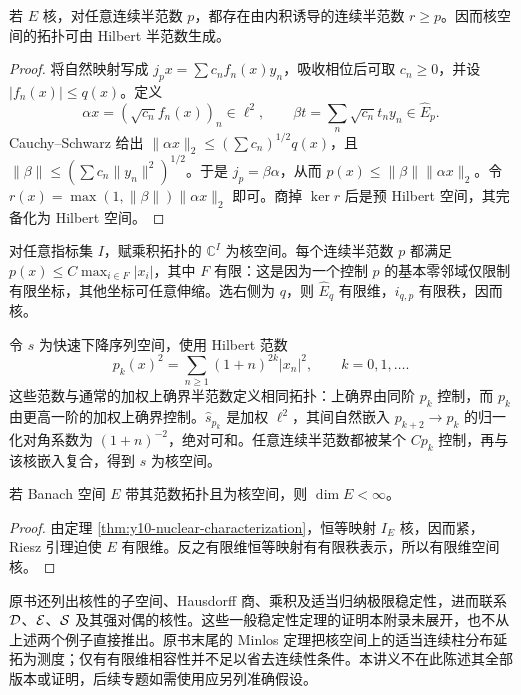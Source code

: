 \begin{proposition}\label{prop:y10-hilbert-seminorm}
若 $E$ 核，对任意连续半范数 $p$，都存在由内积诱导的连续半范数 $r\ge p$。因而核空间的拓扑可由 Hilbert 半范数生成。
\end{proposition}
\begin{proof}
将自然映射写成 $j_px=\sum c_nf_n(x)y_n$，吸收相位后可取 $c_n\ge0$，并设 $|f_n(x)|\le q(x)$。定义
\[
 \alpha x=(\sqrt{c_n}f_n(x))_n\in\ell^2,\qquad
 \beta t=\sum_n\sqrt{c_n}t_ny_n\in\widehat E_p.
\]
Cauchy--Schwarz 给出 $\|\alpha x\|_2\le(\sum c_n)^{1/2}q(x)$，且 $\|\beta\|\le(\sum c_n\|y_n\|^2)^{1/2}$。于是 $j_p=\beta\alpha$，从而 $p(x)\le\|\beta\|\|\alpha x\|_2$。令 $r(x)=\max(1,\|\beta\|)\|\alpha x\|_2$ 即可。商掉 $\ker r$ 后是预 Hilbert 空间，其完备化为 Hilbert 空间。
\end{proof}

\begin{example}[乘积空间与快速下降序列]
对任意指标集 $I$，赋乘积拓扑的 $\mathbb C^I$ 为核空间。每个连续半范数 $p$ 都满足 $p(x)\le C\max_{i\in F}|x_i|$，其中 $F$ 有限：这是因为一个控制 $p$ 的基本零邻域仅限制有限坐标，其他坐标可任意伸缩。选右侧为 $q$，则 $\widehat E_q$ 有限维，$i_{q,p}$ 有限秩，因而核。

令 $s$ 为快速下降序列空间，使用 Hilbert 范数
\[
 p_k(x)^2=\sum_{n\ge1}(1+n)^{2k}|x_n|^2,\qquad k=0,1,\ldots.
\]
这些范数与通常的加权上确界半范数定义相同拓扑：上确界由同阶 $p_k$ 控制，而 $p_k$ 由更高一阶的加权上确界控制。$\widehat s_{p_k}$ 是加权 $\ell^2$，其间自然嵌入 $p_{k+2}\to p_k$ 的归一化对角系数为 $(1+n)^{-2}$，绝对可和。任意连续半范数都被某个 $Cp_k$ 控制，再与该核嵌入复合，得到 $s$ 为核空间。
\end{example}

\begin{proposition}
若 Banach 空间 $E$ 带其范数拓扑且为核空间，则 $\dim E<\infty$。
\end{proposition}
\begin{proof}
由定理 \ref{thm:y10-nuclear-characterization}，恒等映射 $I_E$ 核，因而紧，Riesz 引理迫使 $E$ 有限维。反之有限维恒等映射有有限秩表示，所以有限维空间核。
\end{proof}

原书还列出核性的子空间、Hausdorff 商、乘积及适当归纳极限稳定性，进而联系 $\mathcal{D}$、$\mathcal{E}$、$\mathcal{S}$ 及其强对偶的核性。这些一般稳定性定理的证明本附录未展开，也不从上述两个例子直接推出。原书末尾的 Minlos 定理把核空间上的适当连续柱分布延拓为测度；仅有有限维相容性并不足以省去连续性条件。本讲义不在此陈述其全部版本或证明，后续专题如需使用应另列准确假设。

